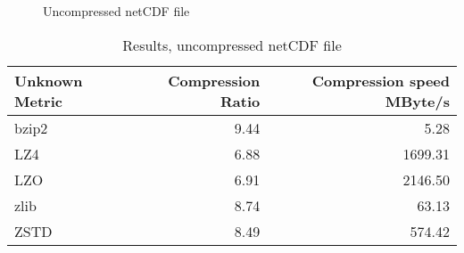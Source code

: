 \begin{figure}[h]
\begin{center}
    \scalebox{0.6}{}
\end{center}
\caption{Uncompressed netCDF file}
\label{fig:nc_uncompressed}
\end{figure}

\begin{table}
\begin{center}
\begin{tabular}{|l|r|r|}
\hline
 Unknown Metric   &   Compression Ratio &   Compression speed MByte/s \\
\hline
 bzip2            &                9.44 &                        5.28 \\
 LZ4              &                6.88 &                     1699.31 \\
 LZO              &                6.91 &                     2146.50 \\
 zlib             &                8.74 &                       63.13 \\
 ZSTD             &                8.49 &                      574.42 \\
\hline
\end{tabular}%
\caption{Results, uncompressed netCDF file}
\label{tab:nc_uncompressed}
\end{center}
\end{table}